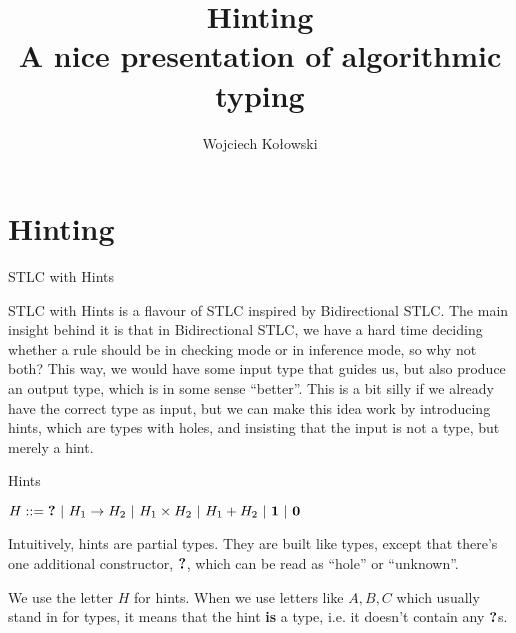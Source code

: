 \documentclass{beamer}
\title{Hinting\\A nice presentation of algorithmic typing}
\author{Wojciech Kołowski}
\date{}
\begin{document}
\frame{\titlepage}

\section{Hinting}

\begin{frame}{STLC with Hints}

STLC with Hints is a flavour of STLC inspired by Bidirectional STLC. The main insight behind it is that in Bidirectional STLC, we have a hard time deciding whether a rule should be in checking mode or in inference mode, so why not both? This way, we would have some input type that guides us, but also produce an output type, which is in some sense ``better''. This is a bit silly if we already have the correct type as input, but we can make this idea work by introducing hints, which are types with holes, and insisting that the input is not a type, but merely a hint.

\end{frame}

\begin{frame}{Hints}

$H ::= \textbf{?} \ |\  H_1 \to H_2 \ |\  H_1 \times H_2 \ |\  H_1 + H_2 \ |\  \textbf{1} \ |\  \textbf{0}$

\vspace{2em}

Intuitively, hints are partial types. They are built like types, except that there's one additional constructor, $\textbf{?}$, which can be read as ``hole'' or ``unknown''.

\vspace{2em}

We use the letter $H$ for hints. When we use letters like $A, B, C$ which usually stand in for types, it means that the hint \textbf{is} a type, i.e. it doesn't contain any $\textbf{?}$s.

\end{frame}
\end{document}
